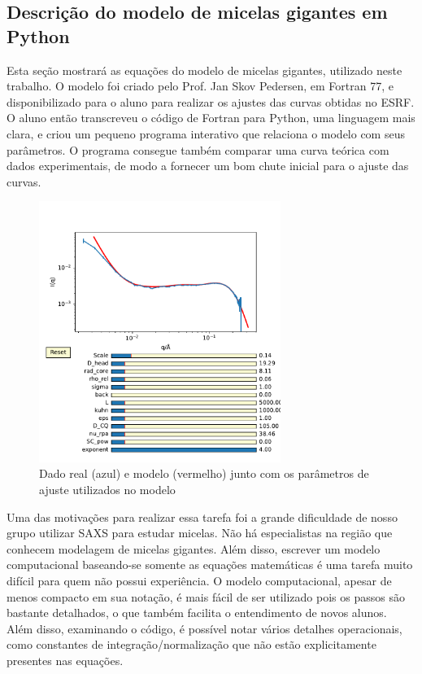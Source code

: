 \begin{apendicesenv}
\section{Descrição do modelo de micelas gigantes em Python}
\label{sec:modelo_MG_python}
	Esta seção mostrará as equações do modelo de micelas gigantes, utilizado neste trabalho. O modelo foi criado pelo Prof. Jan Skov Pedersen, em Fortran 77, e disponibilizado para o aluno para realizar os ajustes das curvas obtidas no ESRF. O aluno então transcreveu o código de Fortran para Python, uma linguagem mais clara, e criou um pequeno programa interativo que relaciona o modelo com seus parâmetros. O programa consegue também comparar uma curva teórica com dados experimentais, de modo a fornecer um bom chute inicial para o ajuste das curvas.
	
\begin{figure}[H]
	\centering
	\includegraphics[width=0.7\textwidth]{imagens/saxs/Modelo_dado_SAXS_python}
	\caption{Dado real (azul) e modelo (vermelho) junto com os parâmetros de ajuste utilizados no modelo}
	\label{fig:saxs_modelo_dado_saxs_python}
\end{figure}

	Uma das motivações para realizar essa tarefa foi a grande dificuldade de nosso grupo utilizar SAXS para estudar micelas. Não há especialistas na região que conhecem modelagem de micelas gigantes. Além disso, escrever um modelo computacional baseando-se somente as equações matemáticas é uma tarefa muito difícil para quem não possui experiência. O modelo computacional, apesar de menos compacto em sua notação, é mais fácil de ser utilizado pois os passos são bastante detalhados, o que também facilita o entendimento de novos alunos. Além disso, examinando o código, é possível notar vários detalhes operacionais, como constantes de integração/normalização que não estão explicitamente presentes nas equações.
	

\end{apendicesenv}
